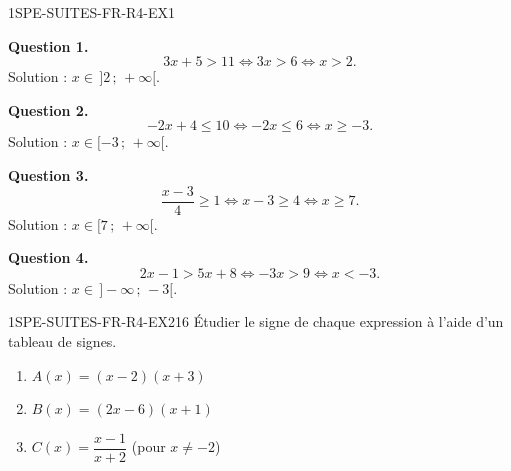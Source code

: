 
\begin{corrige}{1SPE-SUITES-FR-R4-EX1}


\textbf{Question 1.}
\[
3x + 5 > 11 \iff 3x > 6 \iff x > 2.
\]
Solution : $x \in \,]2\,;\,+\infty[$.


\textbf{Question 2.}
\[
-2x + 4 \leq 10 \iff -2x \leq 6 \iff x \geq -3.
\]
Solution : $x \in [-3\,;\,+\infty[$.

\textbf{Question 3.}
\[
\frac{x-3}{4} \geq 1 \iff x - 3 \geq 4 \iff x \geq 7.
\]
Solution : $x \in [7\,;\,+\infty[$.


\textbf{Question 4.}
\[
2x - 1 > 5x + 8 \iff -3x > 9 \iff x < -3.
\]
Solution : $x \in \,]-\infty\,;\,-3[$.

\end{corrige}


\begin{exercice}{1SPE-SUITES-FR-R4-EX2}{1}{6}
Étudier le signe de chaque expression à l'aide d'un tableau de signes.
\begin{enumerate}
  \item $A(x) = (x - 2)(x + 3)$
  \item $B(x) = (2x - 6)(x + 1)$
  \item $C(x) = \dfrac{x - 1}{x + 2}$ (pour $x
\neq -2$)
\end{enumerate}
\end{exercice}


